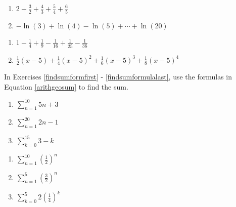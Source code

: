 \documentclass{ximera}
\begin{document}
\begin{multicols}{2}
\begin{enumerate}
\setcounter{enumi}{\value{HW}}

\item $2 + \frac{3}{2} + \frac{4}{3} + \frac{5}{4} + \frac{6}{5}$
\item $-\ln(3) + \ln(4) - \ln(5) + \cdots + \ln(20)$

\setcounter{HW}{\value{enumi}}
\end{enumerate}
\end{multicols}

\begin{multicols}{2}
\begin{enumerate}
\setcounter{enumi}{\value{HW}}

\item $1 - \frac{1}{4} + \frac{1}{9} - \frac{1}{16} + \frac{1}{25} - \frac{1}{36}$
\item $\frac{1}{2}(x - 5) + \frac{1}{4}(x - 5)^{2} + \frac{1}{6}(x - 5)^{3} + \frac{1}{8}(x - 5)^{4}$  \label{writesumlast}

\setcounter{HW}{\value{enumi}}
\end{enumerate}
\end{multicols}


In Exercises \ref{findsumformfirst} - \ref{findsumformulalast}, use the formulas in Equation \ref{arithgeosum} to find the sum.

\begin{multicols}{3}
\begin{enumerate}
\setcounter{enumi}{\value{HW}}

\item $\displaystyle \sum_{n = 1}^{10} 5n+3$ \label{findsumformfirst}

\item $\displaystyle \sum_{n = 1}^{20} 2n-1$ 

\item $\displaystyle \sum_{k = 0}^{15} 3-k$ 

\setcounter{HW}{\value{enumi}}
\end{enumerate}
\end{multicols}

\begin{multicols}{3}
\begin{enumerate}
\setcounter{enumi}{\value{HW}}

\item $\displaystyle \sum_{n = 1}^{10} \left(\frac{1}{2}\right)^{n}$

\item $\displaystyle \sum_{n = 1}^{5} \left(\frac{3}{2}\right)^{n}$ 

\item $\displaystyle \sum_{k = 0}^{5} 2\left(\frac{1}{4}\right)^{k}$ 

\setcounter{HW}{\value{enumi}}
\end{enumerate}
\end{multicols}
\end{document}
